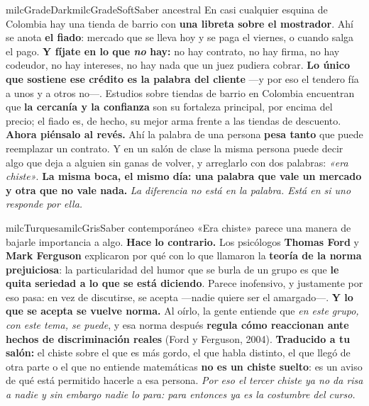 \documentclass[11pt,letterpaper]{article}
\begin{document}
\begin{softbox}{milcGradeDark}{milcGradeSoft}{Saber ancestral}
En casi cualquier esquina de Colombia hay una tienda de barrio con \textbf{una libreta sobre el mostrador}. Ahí se anota \textbf{el fiado}: mercado que se lleva hoy y se paga el viernes, o cuando salga el pago. \textbf{Y fíjate en lo que \emph{no} hay:} no hay contrato, no hay firma, no hay codeudor, no hay intereses, no hay nada que un juez pudiera cobrar. \textbf{Lo único que sostiene ese crédito es la palabra del cliente} ---y por eso el tendero fía a unos y a otros no---. Estudios sobre tiendas de barrio en Colombia encuentran que \textbf{la cercanía y la confianza} son su fortaleza principal, por encima del precio; el fiado es, de hecho, su mejor arma frente a las tiendas de descuento. \textbf{Ahora piénsalo al revés.} Ahí la palabra de una persona \textbf{pesa tanto} que puede reemplazar un contrato. Y en un salón de clase la misma persona puede decir algo que deja a alguien sin ganas de volver, y arreglarlo con dos palabras: \emph{«era chiste»}. \textbf{La misma boca, el mismo día: una palabra que vale un mercado y otra que no vale nada.} \emph{La diferencia no está en la palabra. Está en si uno responde por ella.}
\end{softbox}

\begin{softbox}{milcTurquesa}{milcGris}{Saber contemporáneo}
«Era chiste» parece una manera de bajarle importancia a algo. \textbf{Hace lo contrario.} Los psicólogos \textbf{Thomas Ford} y \textbf{Mark Ferguson} explicaron por qué con lo que llamaron la \textbf{teoría de la norma prejuiciosa}: la particularidad del humor que se burla de un grupo es que \textbf{le quita seriedad a lo que se está diciendo}. Parece inofensivo, y justamente por eso pasa: en vez de discutirse, se acepta ---nadie quiere ser el amargado---. \textbf{Y lo que se acepta se vuelve norma.} Al oírlo, la gente entiende que \emph{en este grupo, con este tema, se puede}, y esa norma después \textbf{regula cómo reaccionan ante hechos de discriminación reales} (Ford y Ferguson, 2004). \textbf{Traducido a tu salón:} el chiste sobre el que es más gordo, el que habla distinto, el que llegó de otra parte o el que no entiende matemáticas \textbf{no es un chiste suelto}: es un aviso de qué está permitido hacerle a esa persona. \emph{Por eso el tercer chiste ya no da risa a nadie y sin embargo nadie lo para: para entonces ya es la costumbre del curso.}
\end{softbox}
\end{document}

